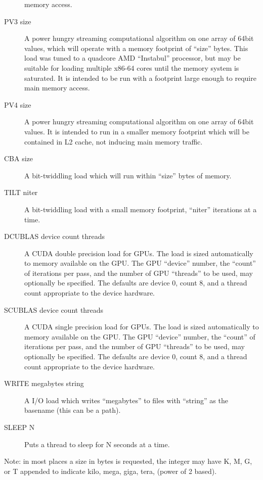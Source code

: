 \begin{description}
	                memory access.
	\item[PV3 size]  A power hungry streaming computational algorithm on one array of 64bit values, which will operate with a memory footprint of ``size'' bytes. This load was tuned to a quadcore AMD
		        ``Instabul'' processor, but may be suitable for loading multiple x86-64 cores until the memory system is saturated. It is intended to be run with a footprint large enough to require main
			memory access.
	\item[PV4 size]  A power hungry streaming computational algorithm on one array of 64bit values. It is intended to run in a smaller memory footprint which will be contained in L2 cache, not
	inducing main memory traffic. 
	\item[CBA size]  A bit-twiddling load which will run within ``size'' bytes of memory.
	\item[TILT niter]  A bit-twiddling load with a small memory footprint, ``niter'' iterations at a time.
	\item[DCUBLAS device count threads] A CUDA double precision load for GPUs. The load is sized automatically to memory available on the GPU. The GPU ``device'' number, the ``count''
	of iterations per pass, and the number of GPU ``threads'' to be used, may optionally be specified.  The defaults are device 0, count 8, and a thread count appropriate to the device hardware.
	\item[SCUBLAS device count threads] A CUDA single precision load for GPUs. The load is sized automatically to memory available on the GPU. The GPU ``device'' number, the ``count''
	of iterations per pass, and the number of GPU ``threads'' to be used, may optionally be specified.  The defaults are device 0, count 8, and a thread count appropriate to the device hardware.
	\item[WRITE megabytes string] A I/O load which writes ``megabytes'' to files with ``string'' as the basename (this can be a path).
	\item[SLEEP N] Puts a thread to sleep for N seconds at a time. 
\end{description}

Note: in most places a size in bytes is requested, the integer may have K, M, G, or T appended to indicate kilo, mega, giga, tera, (power of 2 based).
